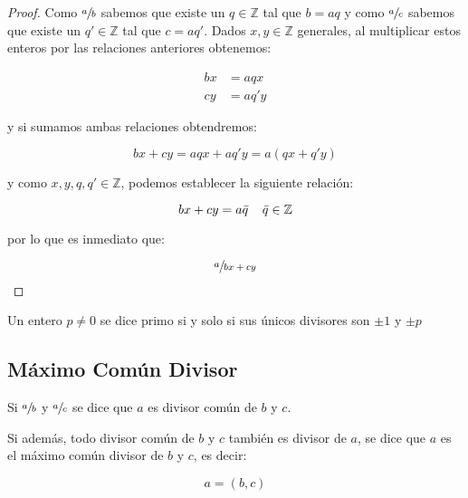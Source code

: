         \begin{proof}
            Como $\sfrac{a}{b}$ sabemos que existe un $q \in \mathbb{Z}$ tal que $b = aq$ y como $\sfrac{a}{c}$ sabemos que existe un $q' \in \mathbb{Z}$ tal que $c = aq'$.
            Dados $x, y \in \mathbb{Z}$ generales, al multiplicar estos enteros por las relaciones anteriores obtenemos:

            \begin{align*}
                bx &= aqx \\
                cy &= aq'y
            \end{align*}

            y si sumamos ambas relaciones obtendremos:

            \begin{equation*}
                bx + cy = aqx + aq'y = a(qx + q'y)
            \end{equation*}

            y como $x, y, q, q' \in \mathbb{Z}$, podemos establecer la siguiente relación:

            \begin{equation*}
                bx + cy = a \bar{q} \quad \mkern2mu \bar{q} \in \mathbb{Z}
            \end{equation*}

            por lo que es inmediato que:

            \begin{equation*}
                \sfrac{a}{bx + cy}
            \end{equation*}
        \end{proof}

        \begin{definicion}
            Un entero $p \ne 0$ se dice primo si y solo si sus únicos divisores son $\pm 1$ y $\pm p$
        \end{definicion}

    \newpage
    \subsection{Máximo Común Divisor}

        \begin{definicion}
            Si $\sfrac{a}{b}$ y $\sfrac{a}{c}$ se dice que $a$ es divisor común de $b$ y $c$.

            Si además, todo divisor común de $b$ y $c$ también es divisor de $a$, se dice que $a$ es el máximo común divisor de $b$ y $c$, es decir:

            \begin{equation}
                a = (b, c)
            \end{equation}
        \end{definicion}

